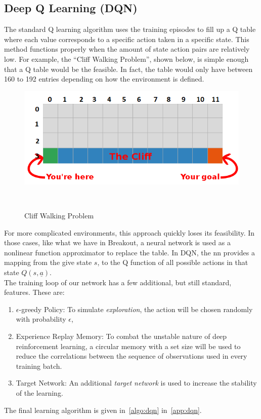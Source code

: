 \subsection{Deep Q Learning (DQN)}
The standard Q learning algorithm uses the training episodes to fill up a Q table where
each value corresponds to a specific action taken in a specific state. This method
functions properly when the amount of state action pairs are relatively low.
For example, the ``Cliff Walking Problem'', shown below, is simple enough that a Q table would be the feasible. In fact, the table would only have between 160 to 192 entries depending on  how the environment is defined.

\begin{figure}[h]
    \centering{}
    \includegraphics[width=\linewidth, height=0.3\textheight, keepaspectratio]{img/cliff_walking.png}
    \caption{Cliff Walking Problem~\autocite{Cliff_photo}}~\label{fig:CliffWalk}
\end{figure}


For more complicated environments, this approach quickly loses its feasibility.
In those cases, like what we have in Breakout, a neural network is used as a
nonlinear function approximator to replace the table. In DQN, the nn provides a
mapping from the give state \(s\), to the Q function of all possible actions in that
state \(Q(s,\underline{a})\).\\
The training loop of our network has a few additional, but still standard, features.
These are:
\begin{enumerate}
    \item
          \(\epsilon \)-greedy Policy: To simulate \textit{exploration}, the action will be chosen randomly with probability \(\epsilon \),
    \item Experience Replay Memory: To combat the unstable nature of deep reinforcement
          learning, a circular memory with a set size will be used to reduce the correlations
          between the sequence of observations used in every training batch.
    \item Target Network: An additional \textit{target network} is used to increase the
          stability of the learning.
\end{enumerate}
The final learning algorithm is given in~\autoref{algo:dqn} in~\autoref{app:dqn}.